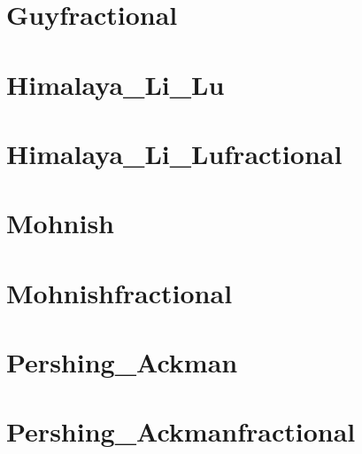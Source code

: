 \documentclass[letterpaper,10pt,english]{sphinxmanual}
\begin{document}
\chapter{Guyfractional}
\label{\detokenize{Guyfractional2021-09-30:guyfractional}}\label{\detokenize{Guyfractional2021-09-30::doc}}
\noindent{}


\chapter{Himalaya\_Li\_Lu}
\label{\detokenize{Himalaya_Li_Lu2021-09-30:himalaya-li-lu}}\label{\detokenize{Himalaya_Li_Lu2021-09-30::doc}}
\noindent{}


\chapter{Himalaya\_Li\_Lufractional}
\label{\detokenize{Himalaya_Li_Lufractional2021-09-30:himalaya-li-lufractional}}\label{\detokenize{Himalaya_Li_Lufractional2021-09-30::doc}}
\noindent{}


\chapter{Mohnish}
\label{\detokenize{Mohnish2021-09-30:mohnish}}\label{\detokenize{Mohnish2021-09-30::doc}}
\noindent{}


\chapter{Mohnishfractional}
\label{\detokenize{Mohnishfractional2021-09-30:mohnishfractional}}\label{\detokenize{Mohnishfractional2021-09-30::doc}}
\noindent{}


\chapter{Pershing\_Ackman}
\label{\detokenize{Pershing_Ackman2021-09-30:pershing-ackman}}\label{\detokenize{Pershing_Ackman2021-09-30::doc}}
\noindent{}


\chapter{Pershing\_Ackmanfractional}
\label{\detokenize{Pershing_Ackmanfractional2021-09-30:pershing-ackmanfractional}}\label{\detokenize{Pershing_Ackmanfractional2021-09-30::doc}}
\noindent{}
\end{document}
